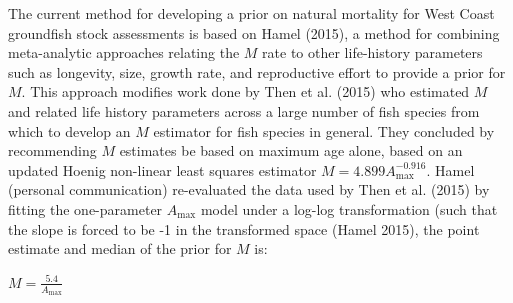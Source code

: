 \documentclass[11pt,
  english,
  a4paper,
]{article}
\begin{document}
\leavevmode\tagmcend\tagstructend


The current method for developing a prior on natural mortality for West Coast groundfish stock assessments is based on Hamel {(2015)\leavevmode\tagmcend\tagstructend}, a method for combining meta-analytic approaches relating the {\(M\)\leavevmode\tagmcend\tagstructend} rate to other life-history parameters such as longevity, size, growth rate, and reproductive effort to provide a prior for {\(M\)\leavevmode\tagmcend\tagstructend}. This approach modifies work done by Then et al. {(2015)\leavevmode\tagmcend\tagstructend} who estimated {\(M\)\leavevmode\tagmcend\tagstructend} and related life history parameters across a large number of fish species from which to develop an {\(M\)\leavevmode\tagmcend\tagstructend} estimator for fish species in general. They concluded by recommending {\(M\)\leavevmode\tagmcend\tagstructend} estimates be based on maximum age alone, based on an updated Hoenig non-linear least squares estimator {\(M = 4.899A^{-0.916}_{\text{max}}\)\leavevmode\tagmcend\tagstructend}. Hamel (personal communication) re-evaluated the data used by Then et al. {(2015)\leavevmode\tagmcend\tagstructend} by fitting the one-parameter {\(A_{\text{max}}\)\leavevmode\tagmcend\tagstructend} model under a log-log transformation (such that the slope is forced to be -1 in the transformed space {(Hamel 2015)\leavevmode\tagmcend\tagstructend}, the point estimate and median of the prior for {\(M\)\leavevmode\tagmcend\tagstructend} is:

\leavevmode\tagmcend\tagstructend\par

\begin{centering}

$M=\frac{5.4}{A_{\text{max}}}$

\end{centering}
\end{document}
